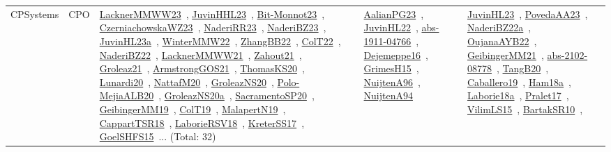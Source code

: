 {\begin{longtable}{lp{3cm}>{\raggedright\arraybackslash}p{6cm}>{\raggedright\arraybackslash}p{6cm}>{\raggedright\arraybackslash}p{8cm}}
CPSystems & CPO & \href{../works/LacknerMMWW23.pdf}{LacknerMMWW23}~\cite{LacknerMMWW23}, \href{../works/JuvinHHL23.pdf}{JuvinHHL23}~\cite{JuvinHHL23}, \href{../works/Bit-Monnot23.pdf}{Bit-Monnot23}~\cite{Bit-Monnot23}, \href{../works/CzerniachowskaWZ23.pdf}{CzerniachowskaWZ23}~\cite{CzerniachowskaWZ23}, \href{../works/NaderiRR23.pdf}{NaderiRR23}~\cite{NaderiRR23}, \href{../works/NaderiBZ23.pdf}{NaderiBZ23}~\cite{NaderiBZ23}, \href{../works/JuvinHL23a.pdf}{JuvinHL23a}~\cite{JuvinHL23a}, \href{../works/WinterMMW22.pdf}{WinterMMW22}~\cite{WinterMMW22}, \href{../works/ZhangBB22.pdf}{ZhangBB22}~\cite{ZhangBB22}, \href{../works/ColT22.pdf}{ColT22}~\cite{ColT22}, \href{../works/NaderiBZ22.pdf}{NaderiBZ22}~\cite{NaderiBZ22}, \href{../works/LacknerMMWW21.pdf}{LacknerMMWW21}~\cite{LacknerMMWW21}, \href{../works/Zahout21.pdf}{Zahout21}~\cite{Zahout21}, \href{../works/Groleaz21.pdf}{Groleaz21}~\cite{Groleaz21}, \href{../works/ArmstrongGOS21.pdf}{ArmstrongGOS21}~\cite{ArmstrongGOS21}, \href{../works/ThomasKS20.pdf}{ThomasKS20}~\cite{ThomasKS20}, \href{../works/Lunardi20.pdf}{Lunardi20}~\cite{Lunardi20}, \href{../works/NattafM20.pdf}{NattafM20}~\cite{NattafM20}, \href{../works/GroleazNS20.pdf}{GroleazNS20}~\cite{GroleazNS20}, \href{../works/Polo-MejiaALB20.pdf}{Polo-MejiaALB20}~\cite{Polo-MejiaALB20}, \href{../works/GroleazNS20a.pdf}{GroleazNS20a}~\cite{GroleazNS20a}, \href{../works/SacramentoSP20.pdf}{SacramentoSP20}~\cite{SacramentoSP20}, \href{../works/GeibingerMM19.pdf}{GeibingerMM19}~\cite{GeibingerMM19}, \href{../works/ColT19.pdf}{ColT19}~\cite{ColT19}, \href{../works/MalapertN19.pdf}{MalapertN19}~\cite{MalapertN19}, \href{../works/CappartTSR18.pdf}{CappartTSR18}~\cite{CappartTSR18}, \href{../works/LaborieRSV18.pdf}{LaborieRSV18}~\cite{LaborieRSV18}, \href{../works/KreterSS17.pdf}{KreterSS17}~\cite{KreterSS17}, \href{../works/GoelSHFS15.pdf}{GoelSHFS15}~\cite{GoelSHFS15}... (Total: 32) & \href{../works/AalianPG23.pdf}{AalianPG23}~\cite{AalianPG23}, \href{../works/JuvinHL22.pdf}{JuvinHL22}~\cite{JuvinHL22}, \href{../works/abs-1911-04766.pdf}{abs-1911-04766}~\cite{abs-1911-04766}, \href{../works/Dejemeppe16.pdf}{Dejemeppe16}~\cite{Dejemeppe16}, \href{../works/GrimesH15.pdf}{GrimesH15}~\cite{GrimesH15}, \href{../works/NuijtenA96.pdf}{NuijtenA96}~\cite{NuijtenA96}, \href{../works/NuijtenA94.pdf}{NuijtenA94}~\cite{NuijtenA94} & \href{../works/JuvinHL23.pdf}{JuvinHL23}~\cite{JuvinHL23}, \href{../works/PovedaAA23.pdf}{PovedaAA23}~\cite{PovedaAA23}, \href{../works/NaderiBZ22a.pdf}{NaderiBZ22a}~\cite{NaderiBZ22a}, \href{../works/OujanaAYB22.pdf}{OujanaAYB22}~\cite{OujanaAYB22}, \href{../works/GeibingerMM21.pdf}{GeibingerMM21}~\cite{GeibingerMM21}, \href{../works/abs-2102-08778.pdf}{abs-2102-08778}~\cite{abs-2102-08778}, \href{../works/TangB20.pdf}{TangB20}~\cite{TangB20}, \href{../works/Caballero19.pdf}{Caballero19}~\cite{Caballero19}, \href{../works/Ham18a.pdf}{Ham18a}~\cite{Ham18a}, \href{../works/Laborie18a.pdf}{Laborie18a}~\cite{Laborie18a}, \href{../works/Pralet17.pdf}{Pralet17}~\cite{Pralet17}, \href{../works/VilimLS15.pdf}{VilimLS15}~\cite{VilimLS15}, \href{../works/BartakSR10.pdf}{BartakSR10}~\cite{BartakSR10}, 
\end{longtable}}
